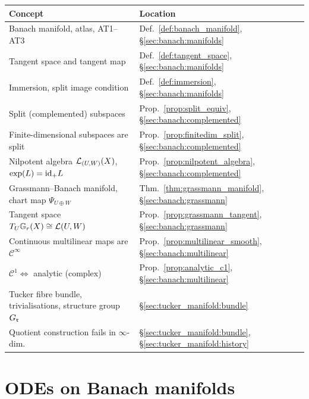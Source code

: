 \begin{center}
\renewcommand{\arraystretch}{1.35}
\begin{tabular}{@{}p{7cm}l@{}}
\toprule
\textbf{Concept} & \textbf{Location} \\
\midrule
Banach manifold, atlas, AT1--AT3
    & Def.~\ref{def:banach_manifold}, \S\ref{sec:banach:manifolds} \\
Tangent space and tangent map
    & Def.~\ref{def:tangent_space}, \S\ref{sec:banach:manifolds} \\
Immersion, split image condition
    & Def.~\ref{def:immersion}, \S\ref{sec:banach:manifolds} \\
Split (complemented) subspaces
    & Prop.~\ref{prop:split_equiv}, \S\ref{sec:banach:complemented} \\
Finite-dimensional subspaces are split
    & Prop.~\ref{prop:finitedim_split}, \S\ref{sec:banach:complemented} \\
Nilpotent algebra $\mathcal{L}_{(U,W)}(X)$, $\exp(L)=\mathrm{id}_{+}L$
    & Prop.~\ref{prop:nilpotent_algebra}, \S\ref{sec:banach:complemented} \\
Grassmann--Banach manifold, chart map $\Psi_{U\oplus W}$
    & Thm.~\ref{thm:grassmann_manifold}, \S\ref{sec:banach:grassmann} \\
Tangent space $T_U\mathbb{G}_{r}(X)\cong\mathcal{L}(U,W)$
    & Prop.~\ref{prop:grassmann_tangent}, \S\ref{sec:banach:grassmann} \\
Continuous multilinear maps are $\mathcal{C}^\infty$
    & Prop.~\ref{prop:multilinear_smooth}, \S\ref{sec:banach:multilinear} \\
$\mathcal{C}^1 \Leftrightarrow$ analytic (complex)
    & Prop.~\ref{prop:analytic_c1}, \S\ref{sec:banach:multilinear} \\
Tucker fibre bundle, trivialisations, structure group $G_{\mathfrak{r}}$
    & \S\ref{sec:tucker_manifold:bundle} \\
Quotient construction fails in $\infty$-dim.\
    & \S\ref{sec:tucker_manifold:bundle}, \S\ref{sec:tucker_manifold:history} \\
\bottomrule
\end{tabular}
\end{center}

\section{ODEs on Banach manifolds}
\label{app:manifolds:ode}

